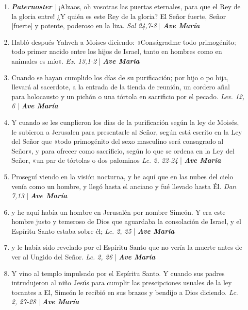 \documentclass[../../devocionario.tex]{subfiles}
\begin{document}
    \begin{enumerate}
        \item \textbf{\textit{Paternoster}} | ¡Alzaos, oh vosotras las puertas eternales, para que el Rey de la gloria entre!
            ¿Y quién es este Rey de la gloria? El Señor fuerte, Señor [fuerte] y potente, poderoso en la liza. \textit{Sal 24,7-8}  | \textbf{\textit{Ave María}}

        \item Habló después Yahveh a Moises diciendo: «Conságradme todo primogénito; todo primer nacido entre los hijos de Israel, 
            tanto en hombres como en animales es mío». \textit{Ex. 13,1-2} | \textbf{\textit{Ave María}}

        \item Cuando se hayan cumplido los días de su purificación; por hijo o po hija, llevará al sacerdote, a la entrada de la tienda de reunión, 
            un cordero añal para holocausto y un pichón o una tórtola en sacrificio por el pecado. \textit{Lev. 12, 6} | \textbf{\textit{Ave María}}

        \item Y cuando se les cunplieron los días de la purificación según la ley de Moisés, le subieron a Jerusalen para presentarle al Señor, 
            según está escrito en la Ley del Señor que «todo primogénito del sexo masculino será consagrado al Señor», 
            y para ofrecer como sacrificio, según lo que se ordena en la Ley del Señor, 
            «un par de tórtolas o dos palominos \textit{Lc. 2, 22-24} | \textbf{\textit{Ave María}}

        \item Proseguí viendo en la visión nocturna, y he aquí que en las nubes del cielo venía como un hombre, 
            y llegó hasta el anciano y fué llevado hasta Él. \textit{Dan 7,13} | \textbf{\textit{Ave María}}

        \item y he aquí había un hombre en Jerusalén por nombre Simeón. Y era este hombre justo y temeroso de Dios que aguardaba la consolación de Israel, 
            y el Espíritu Santo estaba sobre él; \textit{Lc. 2, 25} | \textbf{\textit{Ave María}}

        \item y le había sido revelado por el Espíritu Santo que no vería la muerte antes de ver al Ungido del Señor. \textit{Lc. 2, 26} | \textbf{\textit{Ave María}}

        \item Y vino al templo impulsado por el Espíritu Santo. Y cuando sus padres intrudujeron al niño Jesús para cumplir 
            las prescipciones usuales de la ley tocantes a El, 
            Simeón le recibió en sus brazos y bendijo a Dios diciendo. \textit{Lc. 2, 27-28} | \textbf{\textit{Ave María}}


\end{enumerate}
\end{document}
